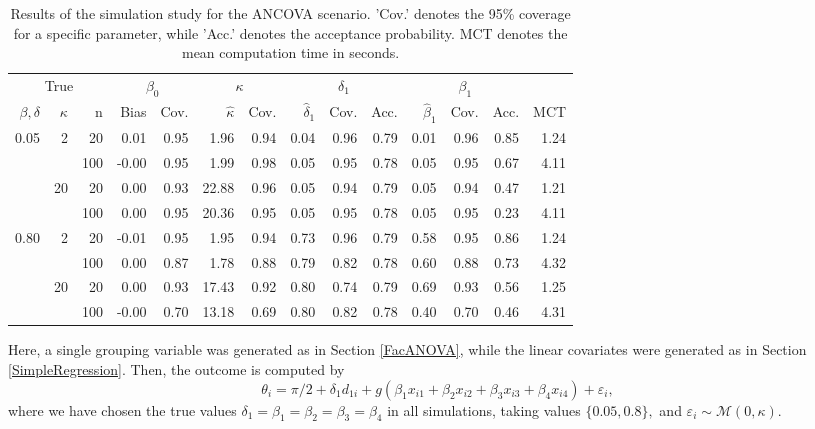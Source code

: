 \documentclass[11pt,a4paper]{article}\usepackage[]{graphicx}\usepackage[]{color}
\begin{document}
\begin{table}[btp]
\centering
\begin{small}
\caption{Results of the simulation study for the ANCOVA scenario. 'Cov.' denotes the 95\% coverage for a specific parameter, while 'Acc.' denotes the acceptance probability. MCT denotes the mean computation time in seconds.} 
\label{tableANCOVA}
\begin{tabular}{rrrrrrrrrrrrrr}
  \toprule \multicolumn{3}{c}{True} & \multicolumn{2}{c}{$\beta_0$} & \multicolumn{2}{c}{$\kappa$} & \multicolumn{3}{c}{$\delta_1$} & \multicolumn{3}{c}{$\beta_1$} \\  \cmidrule(lr){1-3} \cmidrule(lr){4-5} \cmidrule(lr){6-7} \cmidrule(lr){8-10} \cmidrule(lr){11-13}$\beta , \delta$ & $\kappa$ & n & Bias & Cov. & $\hat{\kappa}$ & Cov. & $\hat{\delta}_1$ & Cov. & Acc. & $\hat{\beta}_1$ & Cov. & Acc. & MCT \\ 
  \midrule
0.05 & 2 & 20 & 0.01 & 0.95 & 1.96 & 0.94 & 0.04 & 0.96 & 0.79 & 0.01 & 0.96 & 0.85 & 1.24 \\ 
   \vspace{0.2cm}  &  & 100 & -0.00 & 0.95 & 1.99 & 0.98 & 0.05 & 0.95 & 0.78 & 0.05 & 0.95 & 0.67 & 4.11 \\ 
   & 20 & 20 & 0.00 & 0.93 & 22.88 & 0.96 & 0.05 & 0.94 & 0.79 & 0.05 & 0.94 & 0.47 & 1.21 \\ 
   \vspace{0.2cm}  &  & 100 & 0.00 & 0.95 & 20.36 & 0.95 & 0.05 & 0.95 & 0.78 & 0.05 & 0.95 & 0.23 & 4.11 \\ 
  0.80 & 2 & 20 & -0.01 & 0.95 & 1.95 & 0.94 & 0.73 & 0.96 & 0.79 & 0.58 & 0.95 & 0.86 & 1.24 \\ 
   \vspace{0.2cm}  &  & 100 & 0.00 & 0.87 & 1.78 & 0.88 & 0.79 & 0.82 & 0.78 & 0.60 & 0.88 & 0.73 & 4.32 \\ 
   & 20 & 20 & 0.00 & 0.93 & 17.43 & 0.92 & 0.80 & 0.74 & 0.79 & 0.69 & 0.93 & 0.56 & 1.25 \\ 
   &  & 100 & -0.00 & 0.70 & 13.18 & 0.69 & 0.80 & 0.82 & 0.78 & 0.40 & 0.70 & 0.46 & 4.31 \\ 
   \bottomrule
\end{tabular}
\end{small}
\end{table}


Here, a single grouping variable was generated as in Section \ref{FacANOVA}, while the linear covariates were generated as in Section \ref{SimpleRegression}. Then, the outcome is computed by
\begin{equation}
\theta_i = \pi/2 + \delta_1 d_{1i} + g(\beta_1 x_{i1} + \beta_2 x_{i2} + \beta_3 x_{i3} + \beta_4 x_{i4}) + \varepsilon_i,
\end{equation}
where we have chosen the true values \( \delta_1 = \beta_1 = \beta_2 = \beta_3 = \beta_4 \) in all simulations, taking values \( \{ 0.05, 0.8 \},\) and \( \varepsilon_i \sim \mathcal{M}(0, \kappa).\)
\end{document}
